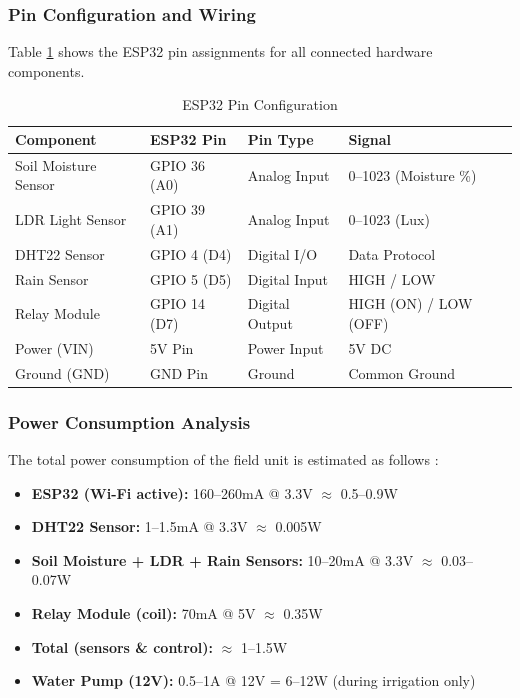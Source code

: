 \subsubsection{Pin Configuration and Wiring}

Table \ref{tab:pin-connections} shows the ESP32 pin assignments 
for all connected hardware components.

\begin{table}[!htbp]
\centering
\caption{ESP32 Pin Configuration}
\label{tab:pin-connections}
\small
\begin{tabularx}{\textwidth}{|p{}|p{}|p{}|X|}
\hline
\textbf{Component} & \textbf{ESP32 Pin} & \textbf{Pin Type} & 
\textbf{Signal} \\
\hline
Soil Moisture Sensor & GPIO 36 (A0) & Analog Input & 
0--1023 (Moisture \%) \\
\hline
LDR Light Sensor & GPIO 39 (A1) & Analog Input & 
0--1023 (Lux) \\
\hline
DHT22 Sensor & GPIO 4 (D4) & Digital I/O & Data Protocol \\
\hline
Rain Sensor & GPIO 5 (D5) & Digital Input & HIGH / LOW \\
\hline
Relay Module & GPIO 14 (D7) & Digital Output & 
HIGH (ON) / LOW (OFF) \\
\hline
Power (VIN) & 5V Pin & Power Input & 5V DC \\
\hline
Ground (GND) & GND Pin & Ground & Common Ground \\
\hline
\end{tabularx}
\end{table}

\FloatBarrier
{}

\subsubsection{Power Consumption Analysis}

The total power consumption of the field unit is estimated as 
follows \cite{raj2021survey}:

\begin{itemize}[leftmargin=1.2cm]
    \item \textbf{ESP32 (Wi-Fi active):} 160--260mA @ 3.3V 
    $\approx$ 0.5--0.9W
    \item \textbf{DHT22 Sensor:} 1--1.5mA @ 3.3V $\approx$ 0.005W
    \item \textbf{Soil Moisture + LDR + Rain Sensors:} 
    10--20mA @ 3.3V $\approx$ 0.03--0.07W
    \item \textbf{Relay Module (coil):} 70mA @ 5V $\approx$ 0.35W
    \item \textbf{Total (sensors \& control):} $\approx$ 1--1.5W
    \item \textbf{Water Pump (12V):} 0.5--1A @ 12V = 6--12W 
    (during irrigation only)
\end{itemize}

